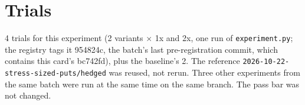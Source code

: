 \documentclass{article}
\begin{document}
\section{Trials}

4 trials for this experiment (2 variants \ensuremath{\times} 1x and 2x, one run of \texttt{experiment.\allowbreak{}py}; the registry tags it 954824c, the batch's last pre-registration commit, which contains this card's bc742fd), plus the baseline's 2. The reference \texttt{2026-\allowbreak{}10-\allowbreak{}22-\allowbreak{}stress-\allowbreak{}sized-\allowbreak{}puts/\allowbreak{}hedged} was reused, not rerun. Three other experiments from the same batch were run at the same time on the same branch. The pass bar was not changed.
\end{document}
